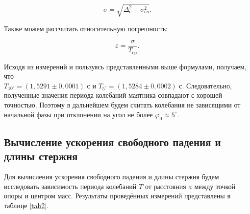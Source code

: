 \documentclass[a4paper,12pt]{article} %
\begin{document}
\begin{equation}
\sigma = \sqrt{\Delta_\text{с}^2+\sigma_\text{сл}^2}.
\end{equation}

Также можем рассчитать относительную погрешность:

\begin{equation}
\varepsilon = \frac{\sigma}{T_\text{ср}}.
\end{equation}

Исходя из измерений и пользуясь представленными выше формулами, получаем, что\\ $  T_{10^\circ} =\left( 1,5291 \pm 0,0001\right)  $ с и $ T_{5^\circ} =\left(  1,5284 \pm 0,0002\right)  $ с. Следовательно, полученные значения периода колебаний маятника совпадают с хорошей точностью. Поэтому в дальнейшем будем считать колебания не зависящими от начальной фазы при отклонении на угол не более $ \varphi_0 \approx 5^\circ$.

\subsection{Вычисление ускорения свободного падения и длины стержня}

Для вычисления ускорения свободного падения и длины стержня будем исследовать зависимость периода колебаний $ T $ от расстояния $ a $ между точкой опоры и центром масс. Результаты проведённых измерений представлены в таблице \ref{tab2}.
\end{document}
